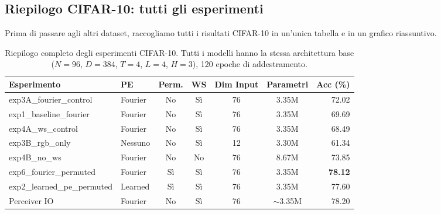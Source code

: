\documentclass[12pt,a4paper]{article}
\begin{document}
\subsection{Riepilogo CIFAR-10: tutti gli esperimenti} \label{sec:riepilogo_cifar}

Prima di passare agli altri dataset, raccogliamo tutti i risultati CIFAR-10 in un'unica tabella e in un grafico riassuntivo.

\begin{table}[htbp]
\centering
\caption{Riepilogo completo degli esperimenti CIFAR-10. Tutti i modelli hanno la stessa architettura base ($N=96$, $D=384$, $T=4$, $L=4$, $H=3$), 120 epoche di addestramento.}
\label{tab:riepilogo_cifar}
\small
\begin{tabular}{@{}llccccr@{}}
\toprule
\textbf{Esperimento} & \textbf{PE} & \textbf{Perm.} & \textbf{WS} & \textbf{Dim Input} & \textbf{Parametri} & \textbf{Acc (\%)} \\
\midrule
exp3A\_fourier\_control & Fourier & No & S\`i & 76 & 3.35M & 72.02 \\
exp1\_baseline\_fourier & Fourier & No & S\`i & 76 & 3.35M & 69.69 \\
exp4A\_ws\_control & Fourier & No & S\`i & 76 & 3.35M & 68.49 \\
exp3B\_rgb\_only & Nessuno & No & S\`i & 12 & 3.30M & 61.34 \\
exp4B\_no\_ws & Fourier & No & No & 76 & 8.67M & 73.85 \\
exp6\_fourier\_permuted & Fourier & S\`i & S\`i & 76 & 3.35M & \textbf{78.12} \\
exp2\_learned\_pe\_permuted & Learned & S\`i & S\`i & 76 & 3.35M & 77.60 \\
\midrule
Perceiver IO & Fourier & No & S\`i & 76 & $\sim$3.35M & 78.20 \\
\bottomrule
\end{tabular}
\end{table}
\end{document}
